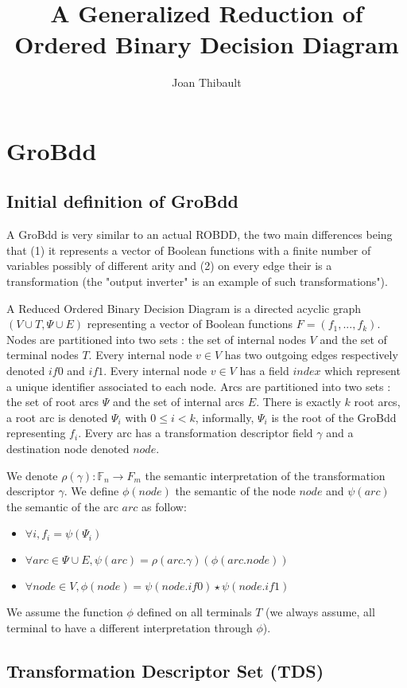 \documentclass[a4paper,10pt]{article}
\title{A Generalized Reduction of Ordered Binary Decision Diagram}
\author{Joan Thibault}
\newcommand{\F}{\mathbb{F}}%
\begin{document}
\section{GroBdd}

\subsection{Initial definition of GroBdd}

A GroBdd is very similar to an actual ROBDD, the two main differences being that (1) it represents a vector of Boolean functions with a finite number of variables possibly of different arity and (2) on every edge their is a transformation (the "output inverter" is an example of such transformations").

A Reduced Ordered Binary Decision Diagram is a directed acyclic graph $(V\cup T, \Psi \cup E)$ representing a vector of Boolean functions $F=(f_1, ..., f_k)$.
Nodes are partitioned into two sets : the set of internal nodes $V$ and the set of terminal nodes $T$.
Every internal node $v\in V$ has two outgoing edges respectively denoted $if0$ and $if1$.
Every internal node $v\in V$ has a field $index$ which represent a unique identifier associated to each node.
Arcs are partitioned into two sets : the set of root arcs $\Psi$ and the set of internal arcs $E$.
There is exactly $k$ root arcs, a root arc is denoted $\Psi_i$ with $0\leq i < k$, informally, $\Psi_i$ is the root of the GroBdd representing $f_i$.
Every arc has a transformation descriptor field $\gamma$ and a destination node denoted $node$.

We denote $\rho(\gamma) : \F_n \longrightarrow F_m$ the semantic interpretation of the transformation descriptor $\gamma$.
We define $\phi(node)$ the semantic of the node $node$ and $\psi(arc)$ the semantic of the arc $arc$ as follow:\begin{itemize}
\item $\forall i, f_i = \psi(\Psi_i)$
\item $\forall arc \in \Psi \cup E, \psi(arc) = \rho(arc.\gamma)(\phi(arc.node))$
\item $\forall node \in V, \phi(node) = \psi(node.if0) \star \psi(node.if1)$
\end{itemize}
We assume the function $\phi$ defined on all terminals $T$ (we always assume, all terminal to have a different interpretation through $\phi$).

\subsection{Transformation Descriptor Set (TDS)}
\end{document}
